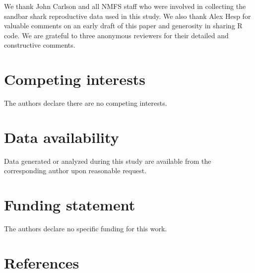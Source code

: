 \documentclass[
]{article}
\begin{document}
We thank John Carlson and all NMFS staff who were involved in collecting the sandbar shark reproductive data used in this study. We also thank Alex Hesp for valuable comments on an early draft of this paper and generosity in sharing R code. We are grateful to three anonymous reviewers for their detailed and constructive comments.

\section{Competing interests}\label{competing-interests}

The authors declare there are no competing interests.

\section{Data availability}\label{data-availability}

Data generated or analyzed during this study are available from the corresponding author upon reasonable request.

\section{Funding statement}\label{funding-statement}

The authors declare no specific funding for this work.

\section*{References}\label{references}
\end{document}
